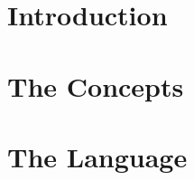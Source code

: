 \documentclass[a4paper]{report}
\begin{document}
\maketitle
\tableofcontents

\chapter{Introduction}


\chapter{The Concepts}


\chapter{The Language}


\appendix
\end{document}
